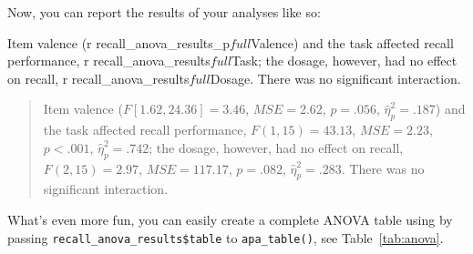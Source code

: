 \documentclass[
  man,floatsintext]{apa6}
\newenvironment{Shaded}{\begin{snugshade}}{\end{snugshade}}
\newcommand{\AttributeTok}[1]{\textcolor[rgb]{0.77,0.63,0.00}{#1}}
\newcommand{\FunctionTok}[1]{\textcolor[rgb]{0.00,0.00,0.00}{#1}}
\newcommand{\NormalTok}[1]{#1}
\newcommand{\SpecialCharTok}[1]{\textcolor[rgb]{0.00,0.00,0.00}{#1}}
\newcommand{\StringTok}[1]{\textcolor[rgb]{0.31,0.60,0.02}{#1}}
\begin{document}
Now, you can report the results of your analyses like so:

\begin{Shaded}
\begin{Highlighting}[]
\NormalTok{Item }\FunctionTok{valence}\NormalTok{ (}\StringTok{\textasciigrave{}}\AttributeTok{r recall\_anova\_results\_p$full$Valence}\StringTok{\textasciigrave{}}\NormalTok{) and the task}
\NormalTok{affected recall performance, }\StringTok{\textasciigrave{}}\AttributeTok{r recall\_anova\_results$full$Task}\StringTok{\textasciigrave{}}\NormalTok{; the dosage,}
\NormalTok{however, had no effect on recall, }\StringTok{\textasciigrave{}}\AttributeTok{r recall\_anova\_results$full$Dosage}\StringTok{\textasciigrave{}}\NormalTok{.}
\NormalTok{There was no significant interaction.}
\end{Highlighting}
\end{Shaded}

\begin{quote}
Item valence (\(F[1.62, 24.36] = 3.46\), \(\mathit{MSE} = 2.62\), \(p = .056\), \(\hat{\eta}^2_p = .187\)) and the task affected recall performance, \(F(1, 15) = 43.13\), \(\mathit{MSE} = 2.23\), \(p < .001\), \(\hat{\eta}^2_p = .742\);
the dosage, however, had no effect on recall, \(F(2, 15) = 2.97\), \(\mathit{MSE} = 117.17\), \(p = .082\), \(\hat{\eta}^2_p = .283\).
There was no significant interaction.
\end{quote}

What's even more fun, you can easily create a complete ANOVA table using by passing \texttt{recall\_anova\_results\$table} to \texttt{apa\_table()}, see Table~\ref{tab:anova}.





\begin{Shaded}
\end{Shaded}
\end{document}
